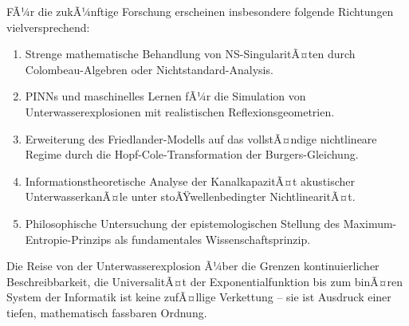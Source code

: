 ﻿\documentclass[12pt,a4paper]{article}
\theoremstyle{definition}
\theoremstyle{remark}
\begin{document}
FÃ¼r die zukÃ¼nftige Forschung erscheinen insbesondere folgende Richtungen vielversprechend:
\begin{enumerate}
\item Strenge mathematische Behandlung von NS-SingularitÃ¤ten durch Colombeau-Alge\-bren oder Nichtstandard-Analysis.
\item PINNs und maschinelles Lernen fÃ¼r die Simulation von Unterwasserexplosionen mit realistischen Reflexionsgeometrien.
\item Erweiterung des Friedlander-Modells auf das vollstÃ¤ndige nichtlineare Regime durch die Hopf-Cole-Transformation der Burgers-Gleichung.
\item Informationstheoretische Analyse der KanalkapazitÃ¤t akustischer UnterwasserkanÃ¤le unter stoÃŸwellenbedingter NichtlinearitÃ¤t.
\item Philosophische Untersuchung der epistemologischen Stellung des Maximum-Entropie-Prinzips als fundamentales Wissenschaftsprinzip.
\end{enumerate}

Die Reise von der Unterwasserexplosion Ã¼ber die Grenzen kontinuierlicher Beschreibbarkeit, die UniversalitÃ¤t der Exponentialfunktion bis zum binÃ¤ren System der Informatik ist keine zufÃ¤llige Verkettung -- sie ist Ausdruck einer tiefen, mathematisch fassbaren Ordnung.
\end{document}
